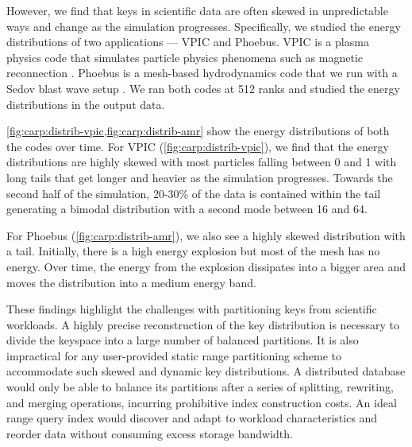 However, we find that keys in scientific data are often skewed in unpredictable ways and change as
the simulation progresses.
Specifically, we studied the energy distributions of two applications --- VPIC and Phoebus.
VPIC is a plasma physics code that simulates particle physics phenomena such as magnetic
reconnection \cite{Byna2012}.
Phoebus is a mesh-based hydrodynamics code that we run with a Sedov blast wave setup
\cite{Barke2024:Phoebus}.
We ran both codes at 512 ranks and studied the energy distributions in the output data.

\figCarpDistribVpic

\cref{fig:carp:distrib-vpic,fig:carp:distrib-amr} show the energy distributions of both the codes over time.
For VPIC (\cref{fig:carp:distrib-vpic}), we find that the energy distributions are highly skewed
with most particles falling between 0 and 1 with long tails that get longer and heavier as the
simulation progresses.
Towards the second half of the simulation, 20-30\% of the data is contained within the tail
generating a bimodal distribution with a second mode between 16 and 64.

\figCarpDistribAmr

For Phoebus (\cref{fig:carp:distrib-amr}), we also see a highly skewed distribution with a tail.
Initially, there is a high energy explosion but most of the mesh has no energy.
Over time, the energy from the explosion dissipates into a bigger area and moves the distribution
into a medium energy band.

These findings highlight the challenges with partitioning keys from scientific workloads.
A highly precise reconstruction of the key distribution is necessary to divide the keyspace into a
large number of balanced partitions.
It is also impractical for any user-provided static range partitioning scheme to accommodate such
skewed and dynamic key distributions.
A distributed database would only be able to balance its partitions after a series of splitting,
rewriting, and merging operations, incurring prohibitive index construction costs.
An ideal range query index would discover and adapt to workload characteristics and reorder data
without consuming excess storage bandwidth.
